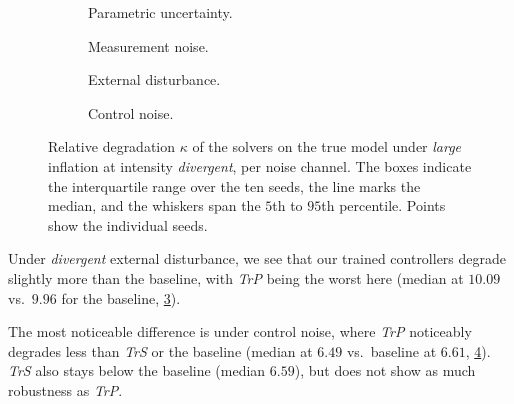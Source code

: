 \begin{figure}[htbp]
  \centering
  \begin{subfigure}[t]{0.49\linewidth}
    \centering
    \caption{Parametric uncertainty.}
    \label{fig:true-noise-large-parametric-divergent}
  \end{subfigure}\hfill
  \begin{subfigure}[t]{0.49\linewidth}
    \centering
    \caption{Measurement noise.}
    \label{fig:true-noise-large-measurement-divergent}
  \end{subfigure}\par\medskip
  \begin{subfigure}[t]{0.49\linewidth}
    \centering
    \caption{External disturbance.}
    \label{fig:true-noise-large-disturbance-divergent}
  \end{subfigure}\hfill
  \begin{subfigure}[t]{0.49\linewidth}
    \centering
    \caption{Control noise.}
    \label{fig:true-noise-large-control-divergent}
  \end{subfigure}
  \caption{Relative degradation $\kappa$ of the solvers on the true model under \emph{large} inflation at intensity
  \emph{divergent}, per noise channel. The boxes indicate the interquartile range over the ten seeds, the line marks the
  median, and the whiskers span the $5$th to $95$th percentile. Points show the individual seeds.}
  \label{fig:true-noise-large-divergent}
\end{figure}

Under \emph{divergent} external disturbance, we see that our trained controllers degrade slightly more than the
baseline, with \emph{TrP} being the worst here (median at $10.09$ vs.\ $9.96$ for the baseline,
\cref{fig:true-noise-large-disturbance-divergent}).

The most noticeable difference is under control noise, where \emph{TrP} noticeably degrades less than \emph{TrS} or the baseline
(median at $6.49$ vs.\ baseline at $6.61$, \cref{fig:true-noise-large-control-divergent}). \emph{TrS} also stays below the baseline
(median $6.59$), but does not show as much robustness as \emph{TrP}.


